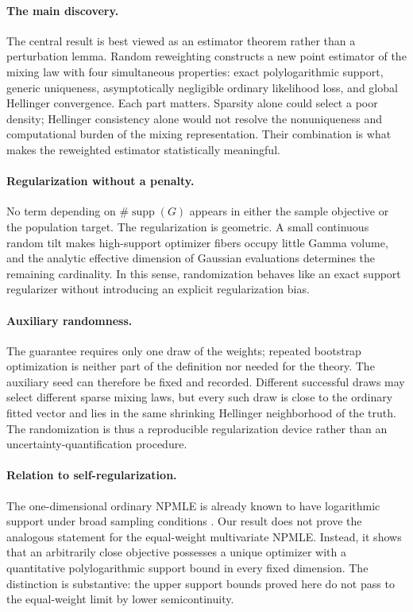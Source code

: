 \documentclass[11pt]{article}
\theoremstyle{definition}
\theoremstyle{remark}
\DeclareMathOperator{\supp}{supp}
\begin{document}
\paragraph{The main discovery.}
The central result is best viewed as an estimator theorem rather than a
perturbation lemma.  Random reweighting constructs a new point estimator of
the mixing law with four simultaneous properties: exact polylogarithmic
support, generic uniqueness, asymptotically negligible ordinary likelihood
loss, and global Hellinger convergence.  Each part matters.  Sparsity alone
could select a poor density; Hellinger consistency alone would not resolve the
nonuniqueness and computational burden of the mixing representation.  Their
combination is what makes the reweighted estimator statistically meaningful.

\paragraph{Regularization without a penalty.}
No term depending on $\#\supp(G)$ appears in either the sample objective or
the population target.  The regularization is geometric.  A small continuous
random tilt makes high-support optimizer fibers occupy little Gamma volume,
and the analytic effective dimension of Gaussian evaluations determines the
remaining cardinality.  In this sense, randomization behaves like an exact
support regularizer without introducing an explicit regularization bias.

\paragraph{Auxiliary randomness.}
The guarantee requires only one draw of the weights; repeated bootstrap
optimization is neither part of the definition nor needed for the theory.
The auxiliary seed can therefore be fixed and recorded.  Different successful
draws may select different sparse mixing laws, but every such draw is close to
the ordinary fitted vector and lies in the same shrinking Hellinger
neighborhood of the truth.  The randomization is thus a reproducible
regularization device rather than an uncertainty-quantification procedure.

\paragraph{Relation to self-regularization.}
The one-dimensional ordinary NPMLE is already known to have logarithmic
support under broad sampling conditions \citep{polyanskiywu2020}.  Our result
does not prove the analogous statement for the equal-weight multivariate
NPMLE\@.  Instead, it shows that an arbitrarily close objective possesses a
unique optimizer with a quantitative polylogarithmic support bound in every
fixed dimension.  The distinction is substantive: the upper support bounds
proved here do not pass to the equal-weight limit by lower semicontinuity.
\end{document}
